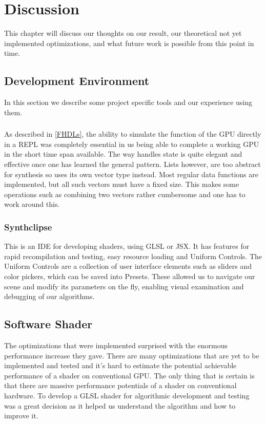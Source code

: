 \chapter{Discussion} 

	This chapter will discuss our thoughts on our result, our theoretical not
	yet	implemented optimizations, and what future work is possible from this
	point in time.
	
	\section{Development Environment}
		
		In this section we describe some project specific tools and our experience using them.
		
		\subsection{\clash}
			As described in \ref{FHDLs}, the ability to simulate the function of
			the GPU directly in a REPL was completely essential in us being able
			to complete a working GPU in the short time span available. The way
			\clash{} handles state is quite elegant and effective once one has
			learned the general pattern. Lists however, are too abstract for
			synthesis so \clash{}  uses its own vector type instead. Most 
			regular
			data functions are implemented, but all such vectors must have a
			fixed size. This makes some operations such as combining two vectors
			rather cumbersome and one has to work around this.
	
		\subsection{Synthclipse}
			This is an IDE for developing shaders, using GLSL or JSX. It has
			features for rapid recompilation and testing, easy resource loading 
			and	Uniform Controls. The Uniform Controls are a collection of user
			interface elements such as sliders and color pickers, which can be
			saved into Presets. These allowed us to navigate our scene and 
			modify its parameters on the fly, enabling visual examination and 
			debugging of our algorithms.		
		
		\section{Software Shader}

			The optimizations that were implemented surprised with the enormous performance increase they gave. There are many optimizations that are yet to be
			implemented and tested and it's hard to estimate the potential
			achievable performance of a shader on conventional GPU. The only thing that is certain is that
			there are massive performance potentials of a shader on conventional hardware. To develop a GLSL shader for algorithmic development and testing was a great decision as it helped us understand the algorithm and how to improve it.
			
